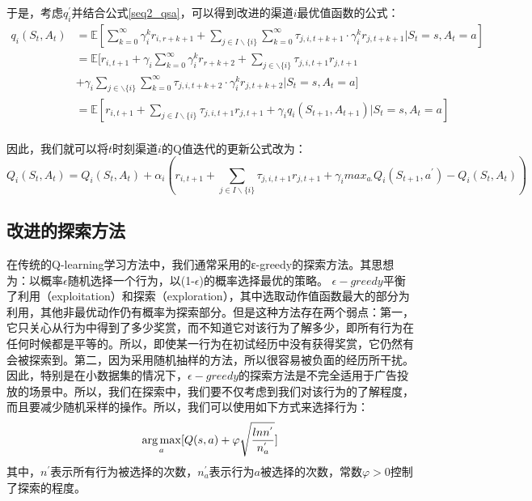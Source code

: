 于是，考虑$q_{i}^{'}$并结合公式\eqref{seq2_qsa}，可以得到改进的渠道$i$最优值函数的公式：
\begin{equation}
\label{seq_modified_q}
\begin{aligned}
q_{i}(S_{t},A_{t})&=\mathbb{E}[\sum_{k=0}^{\infty} \gamma_{i}^{k} r_{i,r+k+1} + \sum_{j \in I \backslash \{i\}} \sum_{k=0}^{\infty} \tau_{j,i,t+k+1} \cdot \gamma_{i}^{k} r_{j,t+k+1} | S_{t}=s, A_t = a]\\
&=\mathbb{E}[r_{i,t+1} + \gamma_{i} \sum_{k=0}^{\infty} \gamma_{i}^{k} r_{r+k+2} + \sum_{j \in \backslash \{i\}} \tau_{j,i,t+1}r_{j, t+1} \\
&+ \gamma_{i} \sum_{j \in \backslash \{i\}} \sum_{k=0}^{\infty} \tau_{j,i,t+k+2} \cdot \gamma_{i}^{k} r_{j,t+k+2} | S_{t}=s, A_t = a]\\
&=\mathbb{E}[r_{i,t+1} + \sum_{j \in I \backslash \{i\}} \tau_{j,i,t+1} r_{j, t+1} + \gamma_{i} q_{i}(S_{t+1},A_{t+1}) | S_{t}=s, A_t = a]\\
\end{aligned}
\end{equation}


因此，我们就可以将$t$时刻渠道$i$的Q值迭代的更新公式改为：
\begin{dmath}
\label{seq_modified_Q}
Q_{i}(S_{t},A_{t})=Q_{i}(S_{t},A_{t})+\alpha_{i}(r_{i, t+1} + \sum_{j \in I \backslash \{i\}} \tau_{j,i,t+1} r_{j, t+1} + \gamma_{i} max_{a_{'}} Q_{i}(S_{t+1}, a^{'}) - Q_{i}(S_{t},A_{t}))
\end{dmath}

\subsection{改进的探索方法}
在传统的Q-learning学习方法中，我们通常采用的ε-greedy的探索方法。其思想为：以概率$\epsilon$随机选择一个行为，以(1-$\epsilon$)的概率选择最优的策略。 $\epsilon-greedy$平衡了利用（exploitation）和探索（exploration），其中选取动作值函数最大的部分为利用，其他非最优动作仍有概率为探索部分。但是这种方法存在两个弱点：第一，它只关心从行为中得到了多少奖赏，而不知道它对该行为了解多少，即所有行为在任何时候都是平等的。所以，即使某一行为在初试经历中没有获得奖赏，它仍然有会被探索到。第二，因为采用随机抽样的方法，所以很容易被负面的经历所干扰。因此，特别是在小数据集的情况下，$\epsilon-greedy$的探索方法是不完全适用于广告投放的场景中。所以，我们在探索中，我们要不仅考虑到我们对该行为的了解程度，而且要减少随机采样的操作。所以，我们可以使用如下方式来选择行为：
\begin{equation}
\begin{aligned}
\operatorname*{arg\,max}_{a}[Q(s,a)+\varphi \sqrt{\frac{ln n^{'}}{n_{a}^{'}}}]
\end{aligned}
\end{equation}
其中，$n^{'}$表示所有行为被选择的次数，$n_{a}^{'}$表示行为$a$被选择的次数，常数$\varphi > 0$控制了探索的程度。

